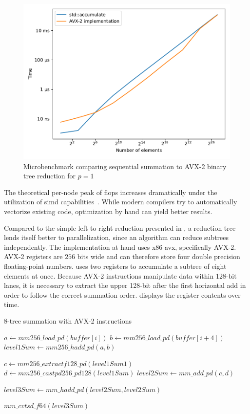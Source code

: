 \begin{figure}
\centering
\includegraphics[scale=0.75]{figures/benchmarkVectorization}
\caption{Microbenchmark comparing sequential summation to AVX-2 binary tree reduction for $p=1$}
\label{fig:benchmarkVectorization}
\end{figure}

The theoretical per-node peak of \gls{flops} increases dramatically under the utilization of \gls{simd} capabilities~\cite{dolbeau_theoretical_2018}.
While modern compilers try to automatically vectorize existing code, optimization by hand can yield better results.

Compared to the simple left-to-right reduction presented in , a reduction tree lends itself better to parallelization, since an algorithm can reduce subtrees independently.
The implementation at hand uses x86 \gls{avx}, specifically AVX-2.
AVX-2 registers are $256$ bits wide and can therefore store four double precision floating-point numbers.
 uses two registers to accumulate a subtree of eight elements at once.
Because AVX-2 instructions manipulate data within 128-bit lanes, it is necessary to extract the upper 128-bit after the first horizontal add in order to follow the correct summation order.
 displays the register contents over time.
\begin{algorithm}
\caption{8-tree summation with AVX-2 instructions}
\label{algo:AVXTreeAccumulation}
\DontPrintSemicolon
\SetAlgoLined
{}

$a \gets mm256\_load\_pd(buffer[i])$\;
$b \gets mm256\_load\_pd(buffer[i + 4])$\;
$level1Sum \gets mm256\_hadd\_pd(a,b)$\;

$c \gets mm256\_extractf128\_pd(level1Sum 1)$\;
$d \gets mm256\_castpd256\_pd128(level1Sum)$\;
$level2Sum \gets mm\_add\_pd(c, d)$\;

$level3Sum \gets mm\_hadd\_pd(level2Sum, level2Sum)$\;

\Return $mm\_cvtsd\_f64(level3Sum)$\;
\end{algorithm}

